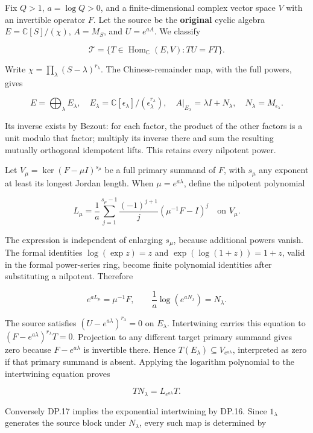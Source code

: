 \documentclass{article}
\begin{document}
Fix \(Q>1\), \(a=\log Q>0\), and a finite-dimensional complex vector space \(V\) with an invertible operator \(F\). Let the source be the \textbf{original} cyclic algebra \(E=\mathbb C[S]/(\chi)\), \(A=M_S\), and \(U=e^{aA}\). We classify

\[
\mathscr T=\{T\in\operatorname{Hom}_{\mathbb C}(E,V):TU=FT\}.
\tag{DP.13}
\]

Write \(\chi=\prod_{\lambda}(S-\lambda)^{r_\lambda}\). The Chinese-remainder map, with the full powers, gives

\[
E=\bigoplus_\lambda E_\lambda,
\quad E_\lambda=\mathbb C[\epsilon_\lambda]/(\epsilon_\lambda^{r_\lambda}),
\quad A|_{E_\lambda}=\lambda I+N_\lambda,
\quad N_\lambda=M_{\epsilon_\lambda}.
\tag{DP.14}
\]

Its inverse exists by Bezout: for each factor, the product of the other factors is a unit modulo that factor; multiply its inverse there and sum the resulting mutually orthogonal idempotent lifts. This retains every nilpotent power.

Let \(V_\mu=\ker(F-\mu I)^{s_\mu}\) be a full primary summand of \(F\), with \(s_\mu\) any exponent at least its longest Jordan length. When \(\mu=e^{a\lambda}\), define the nilpotent polynomial

\[
L_\mu=\frac1a\sum_{j=1}^{s_\mu-1}
 \frac{(-1)^{j+1}}j(\mu^{-1}F-I)^j
\quad\text{on }V_\mu.
\tag{DP.15}
\]

The expression is independent of enlarging \(s_\mu\), because additional powers vanish. The formal identities \(\log(\exp z)=z\) and \(\exp(\log(1+z))=1+z\), valid in the formal power-series ring, become finite polynomial identities after substituting a nilpotent. Therefore

\[
e^{aL_\mu}=\mu^{-1}F,
\qquad \frac1a\log(e^{aN_\lambda})=N_\lambda.
\tag{DP.16}
\]

The source satisfies \((U-e^{a\lambda})^{r_\lambda}=0\) on \(E_\lambda\). Intertwining carries this equation to \((F-e^{a\lambda})^{r_\lambda}T=0\). Projection to any different target primary summand gives zero because \(F-e^{a\lambda}\) is invertible there. Hence \(T(E_\lambda)\subseteq V_{e^{a\lambda}}\), interpreted as zero if that primary summand is absent. Applying the logarithm polynomial to the intertwining equation proves

\[
TN_\lambda=L_{e^{a\lambda}}T.
\tag{DP.17}
\]

Conversely DP.17 implies the exponential intertwining by DP.16. Since \(1_\lambda\) generates the source block under \(N_\lambda\), every such map is determined by
\end{document}
